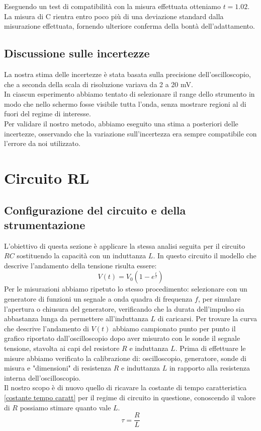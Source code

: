 \documentclass[letterpaper,12pt]{article}
\begin{document}
Eseguendo un test di compatibilità con la misura effettuata otteniamo $t = 1.02$. \\

La misura di C rientra entro poco più di una deviazione standard dalla misurazione effettuata, fornendo ulteriore conferma della bontà dell'adattamento.

\subsection{Discussione sulle incertezze}

La nostra stima delle incertezze è stata basata sulla precisione dell'oscilloscopio, che a seconda della scala di risoluzione variava da 2 a 20 mV. \\
In ciascun esperimento abbiamo tentato di selezionare il range dello strumento in modo che nello schermo fosse visibile tutta l'onda, senza mostrare regioni al di fuori del regime di interesse.\\
Per validare il nostro metodo, abbiamo eseguito una stima a posteriori delle incertezze, osservando che la variazione sull'incertezza era sempre compatibile con l'errore da noi utilizzato.
\newpage
\section{Circuito RL}

\subsection{Configurazione del circuito e della strumentazione}
L'obiettivo di questa sezione è applicare la stessa analisi seguita per il circuito $RC$ sostituendo la capacità con un induttanza $L$.
In questo circuito il modello che descrive l'andamento della tensione risulta essere:
\begin{equation}
    V(t) = V_0 \left(1  -e^{\frac{t}{\tau}}\right)
\end{equation}
Per le misurazioni abbiamo ripetuto lo stesso procedimento: selezionare con un generatore di funzioni un segnale a onda quadra di frequenza $f$, per simulare l'apertura o chiusura del generatore, verificando che la durata dell'impulso sia abbastanza lunga da permettere all'induttanza $L$ di caricarsi.
 Per trovare la curva che descrive l'andamento di $V(t)$ abbiamo campionato punto per punto il grafico riportato dall'oscilloscopio dopo aver misurato con le sonde il segnale tensione, stavolta ai capi del resistore $R$ e induttanza $L$. Prima di effettuare le misure abbiamo verificato la calibrazione di: oscilloscopio, generatore, sonde di misura e "dimensioni" di resistenza $R$ e induttanza $L$ in rapporto alla resistenza interna dell'oscilloscopio.\\
Il nostro scopo è di nuovo quello di ricavare la costante di tempo caratteristica \ref{costante tempo caratt} per il regime di circuito in questione, conoscendo il valore di $R$ possiamo stimare quanto vale $L$. 
\begin{equation}
    \tau = \frac{R}{L}
    \label{costante tempo caratt}
\end{equation}
\newpage
\end{document}
